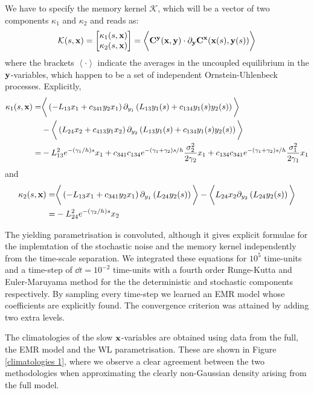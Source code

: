 \documentclass[12pt]{article}
\begin{document}
We have to specify the memory kernel $\mathcal{K}$, which will be a vector of two components $\kappa _1$ and $\kappa _2$ and reads as:
\begin{align}
\mathcal{K}(s,\mathbf{x})=\begin{bmatrix} \kappa _1(s,\mathbf{x}) \\ \kappa_2(s,\mathbf{x}) \end{bmatrix} = \bigg \langle  \mathbf{C}^{\mathbf{y}}(\mathbf{x} , \mathbf{y})\cdot \partial_{\mathbf{y}} \mathbf{C}^{\mathbf{x}}(\mathbf{x} (s),\mathbf{y} (s)) \bigg \rangle 
\end{align}
where the brackets $\left \langle \cdot  \right \rangle$ indicate the averages in the uncoupled equilibrium in the $\mathbf{y}$-variables, which happen to be a set of independent Ornstein-Uhlenbeck processes. Explicitly,
\begin{align}
\kappa_1(s,\mathbf{x}) =&  \bigg \langle \left( -L_{13}x_1+c_{341}y_2x_1 \right)\partial _{y_1}\left( L_{13}y_1(s) + c_{134}y_1(s)y_2(s) \right) \bigg  \rangle \\ 
&-\bigg \langle \left( L_{24}x_2 + c_{413}y_1x_2 \right) \partial _{y_2}\left( L_{13}y_1(s) + c_{134}y_1(s)y_2(s) \right) \bigg  \rangle \\ =& -L_{13}^2e^{-(\gamma _1/h)s}x_1 + c_{341}c_{134}e^{-\left(\gamma_1 + \gamma_2\right)s/h}\frac{\sigma _2^2}{2\gamma_2}x_1+ c_{134}c_{341}e^{-\left(\gamma_1 + \gamma_2\right)s/h}\frac{\sigma _1^2}{2\gamma_1}x_1
\end{align}
and
\begin{align}
\kappa_2(s,\mathbf{x}) =&  \bigg \langle \left( -L_{13}x_1+c_{341}y_2x_1 \right)\partial _{y_1}\left( L_{24}y_2(s) \right) \bigg  \rangle
-\bigg \langle L_{24}x_2 \partial _{y_2}\left( L_{24}y_2(s) \right) \bigg  \rangle \\ =& -L_{24}^2e^{-\left(\gamma _2/h\right)s}x_2
\end{align}

The yielding parametrisation is convoluted, although it gives explicit formulae for the implemtation of the stochastic noise and the memory kernel independently from the time-scale separation. We integrated these equations for $10^5$ time-units and a time-step of $\dd t = 10^{-2}$ time-units with a fourth order Runge-Kutta and Euler-Maruyama method for the the deterministic and stochastic components respectively. By sampling every time-step we learned an EMR model whose coefficients are explicitly found. The convergence criterion was attained by adding two extra levels.

The climatologies of the slow $\mathbf{x}$-variables are obtained using data from the full, the EMR model and the WL parametrisation. These are shown in Figure \ref{climatologies 1}, where we observe a clear agreement between the two methodologies when approximating the clearly non-Gaussian density arising from the full model. 
\end{document}
